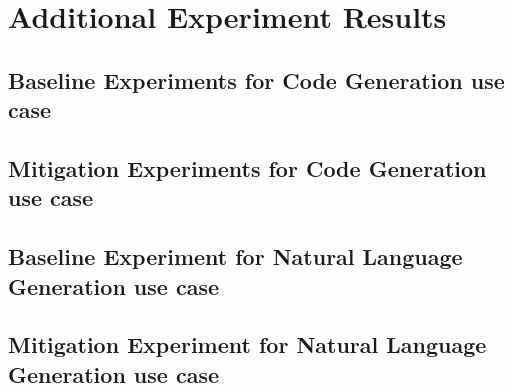 \chapter{Additional Experiment Results}

\section{Baseline Experiments for Code Generation use case} \label{CodeBaselineExperiments}


\section{Mitigation Experiments for Code Generation use case}


\section{Baseline Experiment for Natural Language Generation use case} \label{TraceBaselineExperiments}


\section{Mitigation Experiment for Natural Language Generation use case} \label{TraceMitigationExperiments}

